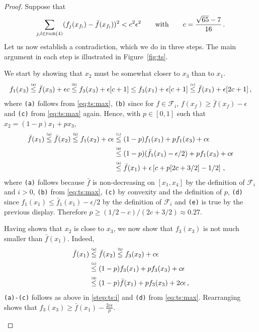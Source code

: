 \documentclass[letter, 12pt]{report}
\newcommand{\pair}{\operatorname{\textsc{pair}}}
\newcommand{\explan}[1]{\stackrel{\text{\tiny \texttt{#1}}}}
\newcommand{\sF}{\mathscr F}
\newcommand{\1}{\mathbf{1}}
\theoremstyle{plain}
\theoremstyle{definition}
\theoremstyle{remark}
\begin{document}
\begin{proof}
    Suppose that
    \begin{align}
        \sum_{j,l \in \pair(4)} (f_j(x_{f_l}) - \bar f(x_{f_l}))^2 < c^2 \epsilon^2 \qquad\text{with}\qquad c = \frac{\sqrt{65} - 7}{16} \,.
        \label{eq:ts:max}
    \end{align}
    Let us now establish a contradiction, which we do in three steps. The main argument in each step is illustrated in Figure~\ref{fig:ts}.
    \begin{enumsteps}
        \item \label{step:ts:i} We start by showing that $x_2$ must be somewhat closer to $x_3$ than to $x_1$.
        \begin{align*}
            f_1(x_3)
            \explan{(a)}\leq \bar f(x_3) + \epsilon c
            \explan{(b)}\leq f_3(x_3) + \epsilon[c+1] \leq f_3(x_1) + \epsilon[c+1]
            \explan{(c)}\leq \bar f(x_1) + \epsilon[2c+1] \,,
        \end{align*}
        where \texttt{(a)} follows from \cref{eq:ts:max}, \texttt{(b)} since for $f \in \sF_i$, $f(x_f) \geq \bar f(x_f) - \epsilon$
        and \texttt{(c)} from \cref{eq:ts:max} again.
        Hence, with $p \in [0,1]$ such that $x_2 = (1 - p)x_1 + p x_3$,
        \begin{align*}
            \bar f(x_1)
            \explan{(a)}\leq \bar f(x_2)
            \explan{(b)}\leq f_1(x_2) + c\epsilon
             & \explan{(c)}\leq (1 - p) f_1(x_1) + p f_1(x_3) + c\epsilon                     \\
             & \explan{(d)}\leq (1 - p) (\bar f_1(x_1) - \epsilon/2) + p f_1(x_3) + c\epsilon \\
             & \explan{(e)}\leq \bar f(x_1) + \epsilon\left[c + p[2c + 3/2] - 1/2\right] \,,
        \end{align*}
        where \texttt{(a)} follows because $\bar f$ is non-decreasing on $[x_1,x_4]$ by the definition of $\sF_i$ and $i > 0$,
        \texttt{(b)} from \cref{eq:ts:max},
        \texttt{(c)} by convexity and the definition of $p$,
        \texttt{(d)} since $f_1(x_1) \leq \bar f_1(x_1) - \epsilon/2$ by the definition of $\sF_i$ and
        \texttt{(e)} is true by the previous display.
        Therefore $p \geq (1/2 - c) / (2c + 3/2) \approx 0.27$.

        \item \label{step:ts:ii} Having shown that $x_2$ is close to $x_3$, we now show that $f_3(x_3)$ is not much smaller than $\bar f(x_1)$. Indeed,
        \begin{align*}
            \bar f(x_1)
             & \explan{(a)}\leq \bar f(x_2)
            \explan{(b)}\leq f_3(x_2) + c\epsilon                                 \\
             & \explan{(c)}\leq (1 - p) f_3(x_1) + p f_3(x_3) + c\epsilon         \\
             & \explan{(d)}\leq (1 - p) \bar f(x_1) + p f_3(x_3) + 2c\epsilon \,,
        \end{align*}
        \texttt{(a)-(c)} follows as above in \ref{step:ts:i} and \texttt{(d)} from \cref{eq:ts:max}.
        Rearranging shows that $f_3(x_3) \geq \bar f(x_1) - \frac{2c\epsilon}{p}$.


\end{enumsteps}
\end{proof}
\end{document}
